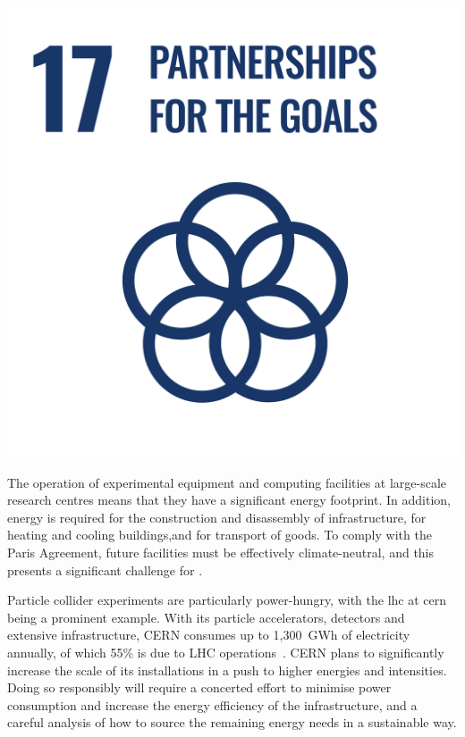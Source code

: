 \documentclass[../SustainableHEP.tex]{subfiles}
\begin{document}
\begin{center}
\includegraphics[width=\SDGsize]{Sections/Figs/Common/SDG_17_PartnershipForGoals.png}

\end{center}


\noindent
The operation of experimental equipment and computing facilities at large-scale research centres means that they have a significant energy footprint. 
In addition, energy is required for the construction and disassembly of infrastructure, for heating and cooling buildings,and for transport of goods. To comply with the Paris Agreement, future facilities must be effectively climate-neutral, and this presents a significant challenge for \ACR.

Particle collider experiments are particularly power-hungry, with the \acrshort{lhc} at \acrshort{cern} being a prominent example. With its particle accelerators, detectors and extensive infrastructure, CERN consumes up to 1,300~GWh of electricity annually, of which 55\% is due to LHC operations~\cite{Environment:2737239,CERNenergymanagement}. CERN plans to significantly increase the scale of its installations in a push to higher energies and intensities. Doing so responsibly will require a concerted effort to minimise power consumption and increase the energy efficiency of the infrastructure, and a careful analysis of how to source the remaining energy needs in a sustainable way.
\end{document}
